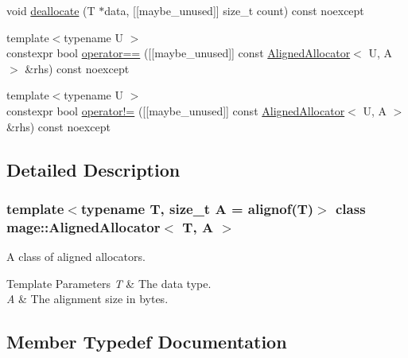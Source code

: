 \begin{DoxyCompactItemize}
\item 
void \mbox{\hyperlink{classmage_1_1_aligned_allocator_a50f2b802bc967bbf13b1364e01f8749a}{deallocate}} (T $\ast$data, \mbox{[}\mbox{[}maybe\+\_\+unused\mbox{]}\mbox{]} size\+\_\+t count) const noexcept
\item 
{\footnotesize template$<$typename U $>$ }\\constexpr bool \mbox{\hyperlink{classmage_1_1_aligned_allocator_aefad04504ff2eb8f73c9ebd15d7fbdad}{operator==}} (\mbox{[}\mbox{[}maybe\+\_\+unused\mbox{]}\mbox{]} const \mbox{\hyperlink{classmage_1_1_aligned_allocator}{Aligned\+Allocator}}$<$ U, A $>$ \&rhs) const noexcept
\item 
{\footnotesize template$<$typename U $>$ }\\constexpr bool \mbox{\hyperlink{classmage_1_1_aligned_allocator_aedd3dda262df6c87e78ce59831442c17}{operator!=}} (\mbox{[}\mbox{[}maybe\+\_\+unused\mbox{]}\mbox{]} const \mbox{\hyperlink{classmage_1_1_aligned_allocator}{Aligned\+Allocator}}$<$ U, A $>$ \&rhs) const noexcept
\end{DoxyCompactItemize}


\subsection{Detailed Description}
\subsubsection*{template$<$typename T, size\+\_\+t A = alignof(\+T)$>$\newline
class mage\+::\+Aligned\+Allocator$<$ T, A $>$}

A class of aligned allocators.


\begin{DoxyTemplParams}{Template Parameters}
{\em T} & The data type. \\
\hline
{\em A} & The alignment size in bytes. \\
\hline
\end{DoxyTemplParams}


\subsection{Member Typedef Documentation}
\mbox{\label{classmage_1_1_aligned_allocator_a144fbbf7d538636d83b3eb45965af6bf}} 
